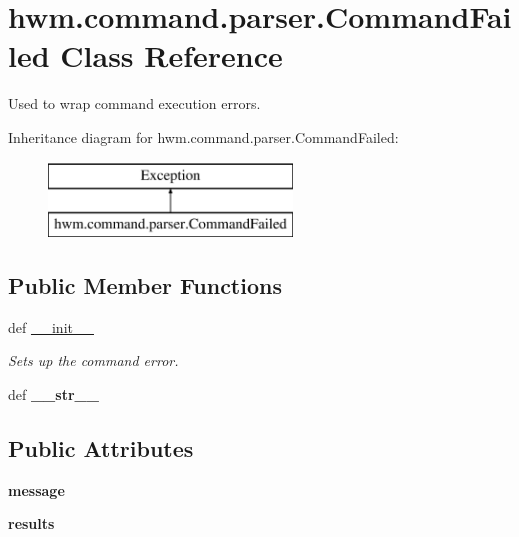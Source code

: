 \hypertarget{classhwm_1_1command_1_1parser_1_1_command_failed}{\section{hwm.\-command.\-parser.\-Command\-Failed Class Reference}
\label{classhwm_1_1command_1_1parser_1_1_command_failed}
}


Used to wrap command execution errors.  


Inheritance diagram for hwm.\-command.\-parser.\-Command\-Failed\-:\begin{figure}[H]
\begin{center}
\leavevmode
\includegraphics[height=2.000000cm]{classhwm_1_1command_1_1parser_1_1_command_failed}
\end{center}
\end{figure}
\subsection*{Public Member Functions}
\begin{DoxyCompactItemize}
\item 
def \hyperlink{classhwm_1_1command_1_1parser_1_1_command_failed_a25b04cd9746a77e4a768fc98e0bbe44b}{\-\_\-\-\_\-init\-\_\-\-\_\-}
\begin{DoxyCompactList}\small\item\em Sets up the command error. \end{DoxyCompactList}\item 
\hypertarget{classhwm_1_1command_1_1parser_1_1_command_failed_a9ac21846f2448e6988d0b93d5d571502}{def {\bfseries \-\_\-\-\_\-str\-\_\-\-\_\-}}\label{classhwm_1_1command_1_1parser_1_1_command_failed_a9ac21846f2448e6988d0b93d5d571502}

\end{DoxyCompactItemize}
\subsection*{Public Attributes}
\begin{DoxyCompactItemize}
\item 
\hypertarget{classhwm_1_1command_1_1parser_1_1_command_failed_a0ccae56fb678a136ea7ddba688cc02d9}{{\bfseries message}}\label{classhwm_1_1command_1_1parser_1_1_command_failed_a0ccae56fb678a136ea7ddba688cc02d9}

\item 
\hypertarget{classhwm_1_1command_1_1parser_1_1_command_failed_a31cc30d473e45434d839ddd45c99a167}{{\bfseries results}}\label{classhwm_1_1command_1_1parser_1_1_command_failed_a31cc30d473e45434d839ddd45c99a167}

\end{DoxyCompactItemize}


